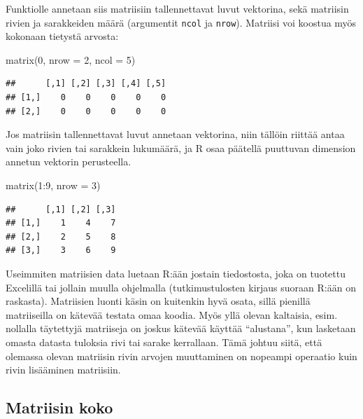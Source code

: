 \documentclass[
]{book}
\newenvironment{Shaded}{\begin{snugshade}}{\end{snugshade}}
\newcommand{\AttributeTok}[1]{\textcolor[rgb]{0.77,0.63,0.00}{#1}}
\newcommand{\DecValTok}[1]{\textcolor[rgb]{0.00,0.00,0.81}{#1}}
\newcommand{\FunctionTok}[1]{\textcolor[rgb]{0.00,0.00,0.00}{#1}}
\newcommand{\NormalTok}[1]{#1}
\newcommand{\SpecialCharTok}[1]{\textcolor[rgb]{0.00,0.00,0.00}{#1}}
\begin{document}
Funktiolle annetaan siis matriisiin tallennettavat luvut vektorina, sekä matriisin rivien ja sarakkeiden määrä (argumentit \texttt{ncol} ja \texttt{nrow}). Matriisi voi koostua myös kokonaan tietystä arvosta:

\begin{Shaded}
\begin{Highlighting}[]
\FunctionTok{matrix}\NormalTok{(}\DecValTok{0}\NormalTok{, }\AttributeTok{nrow =} \DecValTok{2}\NormalTok{, }\AttributeTok{ncol =} \DecValTok{5}\NormalTok{)}
\end{Highlighting}
\end{Shaded}

\begin{verbatim}
##      [,1] [,2] [,3] [,4] [,5]
## [1,]    0    0    0    0    0
## [2,]    0    0    0    0    0
\end{verbatim}

Jos matriisin tallennettavat luvut annetaan vektorina, niin tällöin riittää antaa vain joko rivien tai sarakkein lukumäärä, ja R osaa päätellä puuttuvan dimension annetun vektorin perusteella.

\begin{Shaded}
\begin{Highlighting}[]
\FunctionTok{matrix}\NormalTok{(}\DecValTok{1}\SpecialCharTok{:}\DecValTok{9}\NormalTok{, }\AttributeTok{nrow =} \DecValTok{3}\NormalTok{)}
\end{Highlighting}
\end{Shaded}

\begin{verbatim}
##      [,1] [,2] [,3]
## [1,]    1    4    7
## [2,]    2    5    8
## [3,]    3    6    9
\end{verbatim}

Useimmiten matriisien data luetaan R:ään jostain tiedostosta, joka on tuotettu Excelillä tai jollain muulla ohjelmalla (tutkimustulosten kirjaus suoraan R:ään on raskasta). Matriisien luonti käsin on kuitenkin hyvä osata, sillä pienillä matriiseilla on kätevää testata omaa koodia. Myös yllä olevan kaltaisia, esim. nollalla täytettyjä matriiseja on joskus kätevää käyttää ``alustana'', kun lasketaan omasta datasta tuloksia rivi tai sarake kerrallaan. Tämä johtuu siitä, että olemassa olevan matriisin rivin arvojen muuttaminen on nopeampi operaatio kuin rivin lisääminen matriisiin.

\hypertarget{matriisin-koko}{%
\subsection{Matriisin koko}\label{matriisin-koko}}
\end{document}
